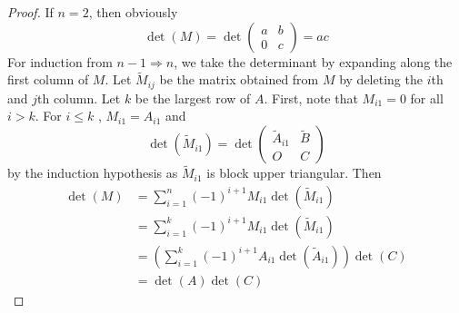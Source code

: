 \begin{homeworkProblem}

\solution

\begin{proof}
If $n = 2$, then obviously \[
\det(M) = \det\begin{pmatrix}
    a & b \\
    0 & c
\end{pmatrix} = ac
\]
For induction from $n-1 \Rightarrow n$, we take the determinant by expanding
along the first column of $M$. Let $\tilde{M}_{ij}$ be the matrix obtained from
$M$ by deleting the $i$th and $j$th column. Let $k$ be the largest row of $A$.
First, note that $M_{i1} = 0$ for all $i > k$. For $i \leq k$ , $M_{i1} = A_{i1}$
and \[
    \det(\tilde{M}_{i1}) = \det\begin{pmatrix}
        \tilde{A}_{i1} & \tilde{B} \\
        O & C
    \end{pmatrix}
\]
by the induction hypothesis as $\tilde{M}_{i1}$ is block upper triangular. Then
\[
    \begin{aligned}
        \det(M) &= \sum_{i=1}^{n}(-1)^{i+1}M_{i1}\det(\tilde{M}_{i1}) \\
        &= \sum_{i=1}^{k}(-1)^{i+1}M_{i1}\det(\tilde{M}_{i1}) \\
        &= \left(\sum_{i=1}^{k}(-1)^{i+1}A_{i1}\det(\tilde{A}_{i1})\right)\det(C)\\
        &= \det(A)\det(C)
    \end{aligned}
\]
\end{proof}

\end{homeworkProblem}
